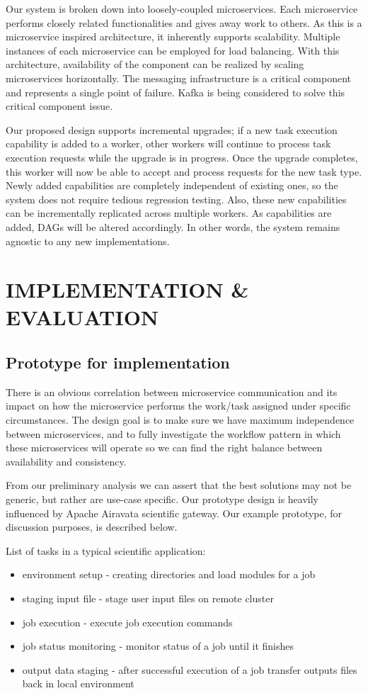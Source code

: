 \documentclass[sigconf]{acmart}
\begin{document}
Our system is broken down into loosely-coupled microservices. Each microservice performs closely related functionalities and gives away work to others. As this is a microservice inspired architecture, it inherently supports scalability. Multiple instances of each microservice can be employed for load balancing. With this architecture, availability of the component can be realized by scaling microservices horizontally. The messaging infrastructure is a critical component and represents a single point of failure. Kafka \cite{kafka2014high} is being considered to solve this critical component issue.

Our proposed design supports incremental upgrades; if a new task execution capability is added to a worker, other workers will continue to process task execution requests while the upgrade is in progress. Once the upgrade completes, this worker will now be able to accept and process requests for the new task type. Newly added capabilities are completely independent of existing ones, so the system does not require tedious regression testing. Also, these new capabilities can be incrementally replicated across multiple workers. As capabilities are added, DAG\textquotesingle s will be altered accordingly.  In other words, the system remains agnostic to any new implementations.

\section{IMPLEMENTATION \& EVALUATION}

\subsection{Prototype for implementation}
There is an obvious  correlation between microservice communication and its impact on how the microservice performs the work/task assigned under specific circumstances. The design goal is to make sure we have maximum independence between microservices, and to fully investigate the workflow pattern in which these microservices will operate so we can find the right balance between availability and consistency.

From our preliminary analysis we can assert that the best solutions may not be generic, but rather are use-case specific. Our prototype design is heavily influenced by Apache Airavata scientific gateway. Our example prototype, for discussion purposes, is described below.

List of tasks in a typical scientific application:
\begin{itemize}
\item environment setup - creating directories and load modules for a job
\item staging input file - stage user input files on remote cluster
\item job execution - execute job execution commands
\item job status monitoring - monitor status of a job until it finishes 
\item output data staging - after successful execution of a job transfer outputs files back in local environment
\end{itemize}
\end{document}
